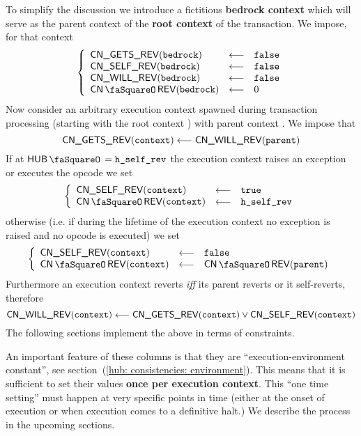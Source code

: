 To simplify the discussion we introduce a fictitious \textbf{bedrock context} \locBedrockContext{} which will serve as the parent context of the \textbf{root context} \locRootContext{} of the transaction.
We impose, for that context
\[
	\left\{ \begin{array}{lcl}
		\cnGetsRev  (\locBedrockContext) & \longleftarrow & \locFalse \\
		\cnSelfRev  (\locBedrockContext) & \longleftarrow & \locFalse \\
		\cnWillRev  (\locBedrockContext) & \longleftarrow & \locFalse \\
		\cnRevStamp (\locBedrockContext) & \longleftarrow & 0         \\
	\end{array} \right.
\]
Now consider an arbitrary execution context \locCurrentContext{} spawned during transaction processing (starting with the root context \locRootContext) with parent context \locParentContext{}.
We impose that
\[
	\textsf{CN}\textsf{\_GETS\_REV}(\texttt{context})  \longleftarrow  \textsf{CN}\textsf{\_WILL\_REV}(\texttt{parent})
\]
If at $\hubStamp = \locRevertStamp$ the execution context \locCurrentContext{} raises an exception or executes the  opcode we set
\[
	\left\{ \begin{array}{lcl}
		\cnSelfRev  (\locCurrentContext) & \longleftarrow & \locTrue         \\
		\cnRevStamp (\locCurrentContext) & \longleftarrow & \locRevertStamp \\
	\end{array} \right.
\]
otherwise (i.e. if during the lifetime of the execution context \locCurrentContext{} no exception is raised and no  opcode is executed) we set 
\[
	\left\{ \begin{array}{lcl}
		\cnSelfRev  (\locCurrentContext) & \longleftarrow & \locFalse                 \\
		\cnRevStamp (\locCurrentContext) & \longleftarrow & \cnRevStamp(\locParentContext) \\
	\end{array} \right.
\]
Furthermore an execution context \locCurrentContext{} reverts \emph{iff} its parent reverts or it self-reverts, therefore
\[
	\textsf{CN}\textsf{\_WILL\_REV}(\texttt{context}) \longleftarrow \textsf{CN}\textsf{\_GETS\_REV}(\texttt{context}) \vee \textsf{CN}\textsf{\_SELF\_REV}(\texttt{context})
\]
The following sections implement the above in terms of constraints.

\saNote{}
An important feature of these columns is that they are ``execution-environment constant'', see section~(\ref{hub: consistencies: environment}).
This means that it is sufficient to set their values \textbf{once per execution context}.
This ``one time setting'' must happen at very specific points in time (either at the onset of execution or when execution comes to a definitive halt.)
We describe the process in the upcoming sections.
